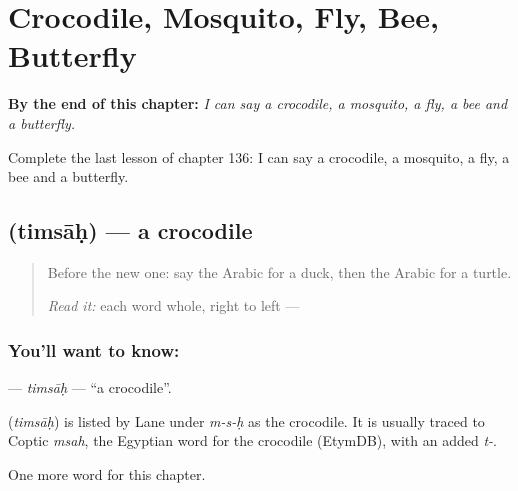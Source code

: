 
\chapter{Crocodile, Mosquito, Fly, Bee, Butterfly}
\label{ch:ar-crocodile-mosquito-fly-bee-butterfly}

\begin{chapteropening}
\textbf{By the end of this chapter:} \emph{I can say a crocodile, a mosquito, a fly, a bee and a butterfly.}

Complete the last lesson of chapter 136: I can say a crocodile, a mosquito, a fly, a bee and a butterfly.
\end{chapteropening}

\section[\texorpdfstring{\ar{تمساح} (timsāḥ)}{تمساح (timsāḥ)}]{ (timsāḥ) — a crocodile}

\label{lesson:AR-C136-timsah}



\begin{quote}
Before the new one: say the Arabic for a duck, then the Arabic for a turtle.

\emph{Read it:} each word whole, right to left — \textbf{} \textbf{} \textbf{}
\end{quote}

\subsection*{You'll want to know: }
\textbf{} — \emph{timsāḥ} — \textquotedblleft{}a crocodile\textquotedblright{}.

\begin{cousinweb}
\textbf{} (\emph{timsāḥ}) is listed by Lane under \emph{m-s-ḥ} as the crocodile. It is usually traced to Coptic \emph{msah}, the Egyptian word for the crocodile (EtymDB), with an added \emph{t-}.
\end{cousinweb}

\begin{grammarlens}[title={What you've built}]
One more word for this chapter.
\end{grammarlens}

